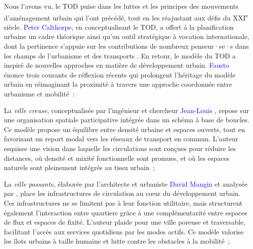 \begin{refsegment}
Nous l’avons vu, le \acrshort{TOD} puise dans les luttes et les principes des mouvements d’aménagement urbain qui l’ont précédé, tout en les réajustant aux défis du XXI\textsuperscript{e} siècle. \textcolor{blue}{Peter Calthorpe}, en conceptualisant le \acrshort{TOD}, a offert à la planification urbaine un cadre théorique ainsi qu'un outil stratégique à vocation internationale, dont la pertinence s’appuie sur les contributions de nombreux penseur·se·s dans les champs de l’urbanisme et des transports \textcolor{blue}{\autocite[111]{almeida_correia_transit-oriented_2020}}. En retour, le modèle du \acrshort{TOD} a inspiré de nouvelles approches en matière de développement urbain. \textcolor{blue}{Fausto} \textcolor{blue}{\textcite[122]{lo_feudo_scenario_2014}} énonce trois courants de réflexion récents qui prolongent l’héritage du modèle urbain en réimaginant la proximité à travers une approche coordonnée entre urbanisme et mobilité~:
    \begin{customitemize}
\item La \textsl{ville creuse}, conceptualisée par l’ingénieur et chercheur \textcolor{blue}{Jean-Louis} \textcolor{blue}{\textcite{maupu_ville_2006}}, repose sur une organisation spatiale participative intégrée dans un schéma à base de boucles. Ce modèle propose un équilibre entre densité urbaine et espaces ouverts, tout en favorisant un report modal  vers les réseaux de transport en commun. L’auteur esquisse une vision dans laquelle les circulations sont conçues pour réduire les distances, où densité et mixité fonctionnelle sont promues, et où les espaces naturels sont pleinement intégrés au tissu urbain~;
\item La \textsl{ville passante}, élaborée par l’architecte et urbaniste \textcolor{blue}{David Mangin} et analysée par \textcolor{blue}{\textcite{masboungi_ville_2008}}, place les infrastructures de circulation au cœur du développement urbain. Ces infrastructures ne se limitent pas à leur fonction utilitaire, mais structurent également l’interaction entre quartiers grâce à une complémentarité entre espaces de flux et espaces de fixité. L’auteur plaide pour une ville poreuse et traversable, facilitant l’accès aux services quotidiens par les modes actifs. Ce modèle valorise les îlots urbains à taille humaine et lutte contre les obstacles à la mobilité~;

\end{customitemize}
\end{refsegment}
